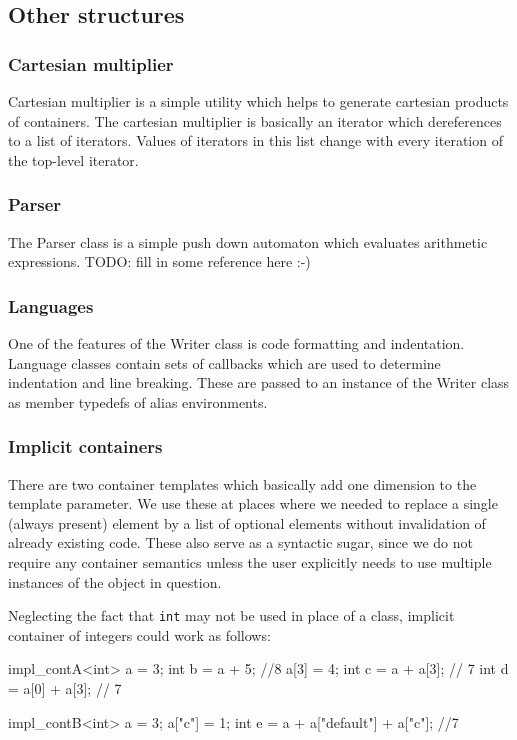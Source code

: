 \subsection*{Other structures}

\subsubsection{Cartesian multiplier}
   Cartesian multiplier is a simple utility which helps to generate cartesian products of containers. The cartesian multiplier is basically an iterator which dereferences to a list of iterators. Values of iterators in this list change with every iteration of the top-level iterator.

\subsubsection{Parser}
  The Parser class is a simple push down automaton which evaluates arithmetic expressions. TODO: fill in some reference here :-)

\subsubsection{Languages}
  One of the features of the Writer class is code formatting and indentation. Language classes contain sets of callbacks which are used to determine indentation and line breaking. These are passed to an instance of the Writer class as member typedefs of alias environments.

\subsubsection{Implicit containers}
  There are two container templates which basically add one dimension to the template parameter. We use these at places where we needed to replace a single (always present) element by a list of optional elements without invalidation of already existing code. These also serve as a syntactic sugar, since we do not require any container semantics unless the user explicitly needs to use multiple instances of the object in question.

  Neglecting the fact that \texttt{int} may not be used in place of a class, implicit container of integers could work as follows:
\mybeginfig
\begin{code}
impl_contA<int> a = 3;
int b = a + 5; //8
a[3] = 4;
int c = a + a[3]; // 7
int d = a[0] + a[3]; // 7

impl_contB<int> a = 3;
a["c"] = 1;
int e = a + a["default"] + a["c"]; //7
\end{code}

